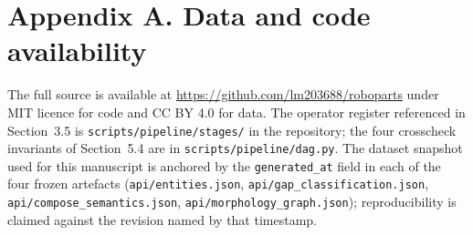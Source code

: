 \documentclass[review]{elsarticle}
\begin{document}
\section*{Appendix A. Data and code availability}

The full source is available at
\url{https://github.com/lm203688/roboparts} under MIT licence for
code and CC BY 4.0 for data. The operator register referenced in
Section~3.5 is \texttt{scripts/pipeline/stages/} in the repository;
the four crosscheck invariants of Section~5.4 are in
\texttt{scripts/pipeline/dag.py}. The dataset snapshot used for
this manuscript is anchored by the \texttt{generated\_at} field in
each of the four frozen artefacts (\texttt{api/entities.json},
\texttt{api/gap\_classification.json}, \texttt{api/compose\_semantics.json},
\texttt{api/morphology\_graph.json}); reproducibility is claimed
against the revision named by that timestamp.





\end{document}
